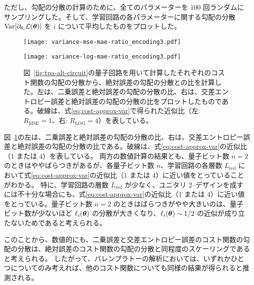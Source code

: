 ただし、勾配の分散の計算のために、全てのパラメーターを $100$ 回ランダムにサンプリングした。そして、学習回路の各パラメーターに関する勾配の分散 $\operatorname{Var}[\partial_{\theta_i} \mathcal{L}(\boldsymbol{\theta})]$ を $i$ について平均したものをプロットした。


\begin{figure}
    \begin{minipage}[b]{0.5\columnwidth}
        \centering
        \texttt{[image: variance-mse-mae-ratio\_encoding3.pdf]}
    \end{minipage}
    \begin{minipage}[b]{0.5\columnwidth}
        \centering
        \texttt{[image: variance-log-mae-ratio\_encoding3.pdf]}
    \end{minipage}
    \caption{図~\ref{fig:tpa-alt-circuit}の量子回路を用いて計算したそれぞれのコスト関数の勾配の分散から、絶対誤差の勾配の分散との比を計算した。左は、二乗誤差と絶対誤差の勾配の分散の比、右は、交差エントロピー誤差と絶対誤差の勾配の分散の比をプロットしたものである。破線は、式\eqref{eq:cost-approx-var}で得られた近似比（左: $R_{\mathrm{MSE}}=1$、右: $R_{\mathrm{LOG}}=4$）を表している。}
    \label{fig:qml-var-ratio}
\end{figure}


図~\ref{fig:qml-var-ratio}の左は、二乗誤差と絶対誤差の勾配の分散の比、右は、交差エントロピー誤差と絶対誤差の勾配の分散の比である。破線は、式\eqref{eq:cost-approx-var}の近似比（$1$ または $4$）を表している。
両方の数値計算の結果とも、量子ビット数 $n=2$ のときはややばらつきがあるが、各量子ビット数 $n$、学習回路の各層数 $L_{\text{red}}$ において式\eqref{eq:cost-approx-var}の近似比（$1$ または $4$）に近い値をとっていることがわかる。
特に、学習回路の層数 $L_{\text{red}}$ が少なく、ユニタリ $2$--デザインを成すには不十分な場合にも、式\eqref{eq:cost-approx-var}の近似比（$1$ または $4$）に近い値をとっている。量子ビット数 $n=2$ のときはばらつきがやや大きいのは、量子ビット数が少ないほど $\ell_i(\boldsymbol{\theta})$ の分散が大きくなり、$\ell_i(\boldsymbol{\theta}) \sim 1/2$ の近似が成り立たないためであると考えられる。

このことから、数値的にも、二乗誤差と交差エントロピー誤差のコスト関数の勾配の分散は、絶対誤差のコスト関数の勾配の分散と同程度のスケーリングであると考えられる。
したがって、バレンプラトーの解析においては、いずれかひとつについてのみ考えれば、他のコスト関数についても同様の結果が得られると推測される。


